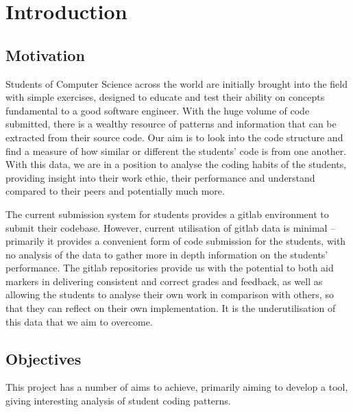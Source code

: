 
\chapter{Introduction} %

\label{Introduction} %


\section{Motivation}

Students of Computer Science across the world are initially brought into the field
with simple exercises, designed to educate and test their ability on concepts
fundamental to a good software engineer. With the huge volume of code submitted,
there is a wealthy resource of patterns and information that can be extracted
from their source code. Our aim is to look into the code structure and find
a measure of how similar or different the students' code is from one another.
With this data, we are in a position to analyse the coding habits of the students,
providing insight into their work ethic, their performance and understand compared
to their peers and potentially much more.

The current submission system for students provides a gitlab
environment to submit their codebase. However, current utilisation of gitlab 
data is minimal -- primarily it provides a
convenient form of code submission for the students, with no analysis of the 
data to gather more in depth information on the students' performance.
The gitlab repositories provide us with the potential to both aid markers
in delivering consistent and correct grades and feedback, as well as allowing
the students to analyse their own work in comparison with others, so that they
can reflect on their own implementation. It is the underutilisation of this
data that we aim to overcome.

\section{Objectives}
This project has a number of aims to achieve, primarily aiming to develop a 
tool, giving interesting analysis of student coding patterns. 


